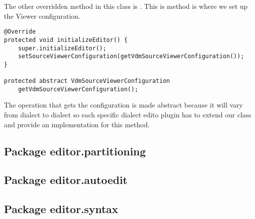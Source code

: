 The other overridden method in this class is . This is method is where we set up the Viewer configuration.
\begin{lstlisting}
@Override
protected void initializeEditor() {		
	super.initializeEditor();
	setSourceViewerConfiguration(getVdmSourceViewerConfiguration());
}

protected abstract VdmSourceViewerConfiguration 
	getVdmSourceViewerConfiguration();
\end{lstlisting}
The operation that gets the  configuration is made abstract because it will vary from dialect to dialect so each specific dialect edito plugin has to extend our  class and provide an implementation for this method.


\subsection{Package editor.partitioning}

\subsection{Package editor.autoedit}

\subsection{Package editor.syntax}


